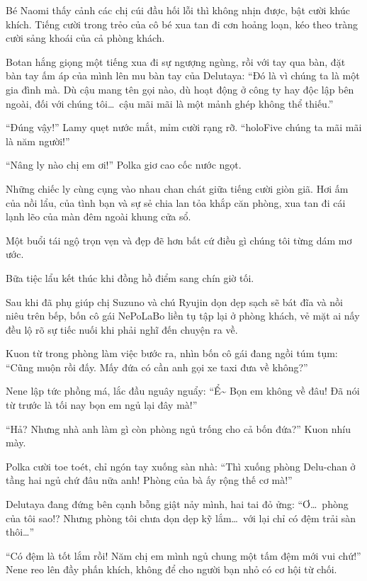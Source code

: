 \documentclass[../main.tex]{subfiles}
\begin{document}
Bé Naomi thấy cảnh các chị cúi đầu hối lỗi thì không nhịn được, bật cười khúc khích. Tiếng cười trong trẻo của cô bé xua tan đi cơn hoảng loạn, kéo theo tràng cười sảng khoái của cả phòng khách.

Botan hắng giọng một tiếng xua đi sự ngượng ngùng, rồi với tay qua bàn, đặt bàn tay ấm áp của mình lên mu bàn tay của Delutaya: ``Đó là vì chúng ta là một gia đình mà. Dù cậu mang tên gọi nào, dù hoạt động ở công ty hay độc lập bên ngoài, đối với chúng tôi\dots\ cậu mãi mãi là một mảnh ghép không thể thiếu.''

``Đúng vậy!'' Lamy quẹt nước mắt, mỉm cười rạng rỡ. ``holoFive chúng ta mãi mãi là năm người!''

``Nâng ly nào chị em ơi!'' Polka giơ cao cốc nước ngọt.

Những chiếc ly cùng cụng vào nhau chan chát giữa tiếng cười giòn giã. Hơi ấm của nồi lẩu, của tình bạn và sự sẻ chia lan tỏa khắp căn phòng, xua tan đi cái lạnh lẽo của màn đêm ngoài khung cửa sổ.

Một buổi tái ngộ trọn vẹn và đẹp đẽ hơn bất cứ điều gì chúng tôi từng dám mơ ước.

\omk

\pov{-}

Bữa tiệc lẩu kết thúc khi đồng hồ điểm sang chín giờ tối.

Sau khi đã phụ giúp chị Suzuno và chú Ryujin dọn dẹp sạch sẽ bát đĩa và nồi niêu trên bếp, bốn cô gái NePoLaBo liền tụ tập lại ở phòng khách, vẻ mặt ai nấy đều lộ rõ sự tiếc nuối khi phải nghĩ đến chuyện ra về.

Kuon từ trong phòng làm việc bước ra, nhìn bốn cô gái đang ngồi túm tụm: ``Cũng muộn rồi đấy. Mấy đứa có cần anh gọi xe taxi đưa về không?''

Nene lập tức phồng má, lắc đầu nguây nguẩy: ``Ể\~{} Bọn em không về đâu! Đã nói từ trước là tối nay bọn em ngủ lại đây mà!''

``Hả? Nhưng nhà anh làm gì còn phòng ngủ trống cho cả bốn đứa?'' Kuon nhíu mày.

Polka cười toe toét, chỉ ngón tay xuống sàn nhà: ``Thì xuống phòng Delu-chan ở tầng hai ngủ chứ đâu nữa anh! Phòng của bà ấy rộng thế cơ mà!''

Delutaya đang đứng bên cạnh bỗng giật nảy mình, hai tai đỏ ửng: ``Ơ\dots\ phòng của tôi sao!? Nhưng phòng tôi chưa dọn dẹp kỹ lắm\dots\ với lại chỉ có đệm trải sàn thôi\dots''

``Có đệm là tốt lắm rồi! Năm chị em mình ngủ chung một tấm đệm mới vui chứ!'' Nene reo lên đầy phấn khích, không để cho người bạn nhỏ có cơ hội từ chối.
\end{document}
